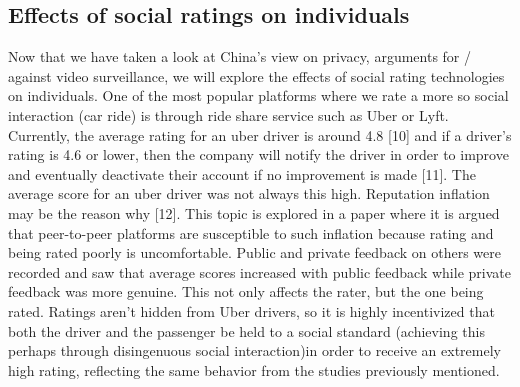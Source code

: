 \documentclass[letterpaper, 10 pt, conference]{ieeeconf}  %
\begin{document}
\subsection{Effects of social ratings on individuals}
Now that we have taken a look at China’s view on privacy, arguments for / against video surveillance, we will explore the effects of social rating technologies on individuals. One of the most popular platforms where we rate a more so social interaction (car ride) is through ride share service such as Uber or Lyft. Currently, the average rating for an uber driver is around 4.8  [10] and if a driver’s rating is 4.6 or lower, then the company will notify the driver in order to improve and eventually deactivate their account if no improvement is made [11].  The average score for an uber driver was not always this high. Reputation inflation may be the reason why [12]. This topic is explored in a paper where it is argued that peer-to-peer platforms are susceptible to such inflation because rating and being rated poorly is uncomfortable. Public and private feedback on others were recorded and saw that average scores increased with public feedback while private feedback was more genuine. This not only affects the rater, but the one being rated. Ratings aren’t hidden from Uber drivers, so it is highly incentivized that both the driver and the passenger be held to a social standard (achieving this perhaps through disingenuous social interaction)in order to receive an extremely high rating, reflecting the same behavior from the studies previously mentioned.



\end{document}
